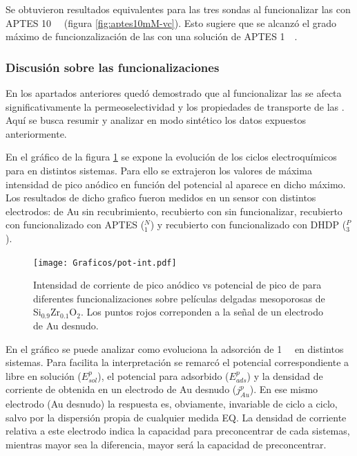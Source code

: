 		  Se obtuvieron resultados equivalentes para las tres sondas al funcionalizar las \pdmZ\space con APTES \SI{10}{\milli\Molar} (figura \ref{fig:aptes10mM-vc}). Esto sugiere que se alcanzó el grado máximo de funcionzalización de las \pdmZ\space con una solución de APTES \SI{1}{\milli\Molar}.

	 	\subsubsection{Discusión sobre las funcionalizaciones}

	 	 En los apartados anteriores quedó demostrado que al funcionalizar las \pdmZ\space se afecta significativamente la permeoselectividad y los propiedades de transporte de las \pdm. Aquí se busca resumir y analizar en modo sintético los datos expuestos anteriormente. 

	 	 En el gráfico de la figura \ref{fig:pot-int} se expone la evolución de los ciclos electroquímicos para \ru\space en distintos sistemas. Para ello se extrajeron los valores de máxima intensidad de pico anódico en función del potencial al aparece en dicho máximo. Los resultados de dicho grafico fueron medidos en un sensor con distintos electrodos: de Au  sin recubrimiento, recubierto con \pdmZ\space sin funcionalizar, recubierto con \pdmZ\space funcionalizado con APTES (\pdmZ$^N_1$) y recubierto con \pdmZ\space funcionalizado con DHDP (\pdmZ$^P_3$).

	 			 \begin{figure}[h!]	
					\centering
			 	    \texttt{[image: Graficos/pot-int.pdf]}
			        \caption[Evolución de la señal de \ru\space para distintos sistemas]{Intensidad de corriente de pico anódico vs potencial de pico de \aminorutenio\space para diferentes funcionalizaciones sobre películas delgadas mesoporosas de Si$_{0.9}$Zr$_{0.1}$O$_2$. Los puntos rojos correponden a la señal de un electrodo de Au  desnudo.}
			        \label{fig:pot-int}
			        \vspace*{3mm}
			      	\end{figure}

	 	 En el gráfico se puede analizar como evoluciona la adsorción de \ru\space \SI{1}{\milli\Molar} en distintos sistemas. Para facilita la interpretación se remarcó el potencial correspondiente a \ru\space libre en solución ($E^p_{sol}$), el potencial para \ru\space adsorbido ($E^p_{ads}$) y la densidad de corriente de \ru\space obtenida en un electrodo de Au  desnudo ($j^p_{Au}$). En ese mismo electrodo (Au desnudo) la respuesta es, obviamente, invariable de ciclo a ciclo, salvo por la dispersión propia de cualquier medida EQ. La densidad de corriente relativa a este electrodo indica la capacidad para preconcentrar de cada sistemas, mientras mayor sea la diferencia, mayor será la capacidad de preconcentrar.

